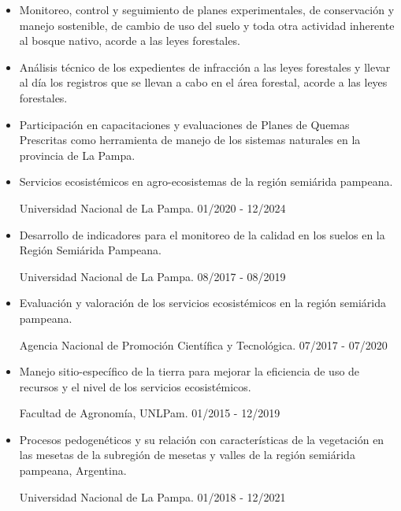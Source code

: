 \documentclass[9.5pt,a4paper,ragged2e, normalphoto]{altacv}
\begin{document}
 \begin{itemize}
\item Monitoreo, control y seguimiento de planes experimentales, de conservación y manejo sostenible, de cambio de uso del suelo y toda otra actividad inherente al bosque nativo, acorde a las leyes forestales.
\item Análisis técnico de los expedientes de infracción a las leyes forestales y llevar al día los registros que se llevan a cabo en el área forestal, acorde a las leyes forestales.
\item Participación en capacitaciones y evaluaciones de Planes de Quemas Prescritas como herramienta de manejo de los sistemas naturales en la provincia de La Pampa. 
\end{itemize}
\divider


\newpage
{}



\begin{itemize}
 \item {Servicios ecosistémicos en agro-ecosistemas de la región semiárida pampeana. 
 
Universidad Nacional de La Pampa. 01/2020 - 12/2024}

\item {Desarrollo de indicadores para el monitoreo de la calidad en los suelos en la Región Semiárida Pampeana. 
 
Universidad Nacional de La Pampa. 08/2017 - 08/2019}

\item {Evaluación y valoración de los servicios ecosistémicos en la región semiárida pampeana. 
 
Agencia Nacional de Promoción Científica y Tecnológica. 07/2017 - 07/2020}

\item {Manejo sitio-específico de la tierra para mejorar la eficiencia de uso de recursos y el nivel de los servicios ecosistémicos. 
 
Facultad de Agronomía, UNLPam. 01/2015 - 12/2019}

\item {Procesos pedogenéticos y su relación con características de la vegetación en las mesetas de la subregión de mesetas y valles de la región semiárida pampeana, Argentina. 
 
Universidad Nacional de La Pampa. 01/2018 - 12/2021}

\end{itemize}
\end{document}
